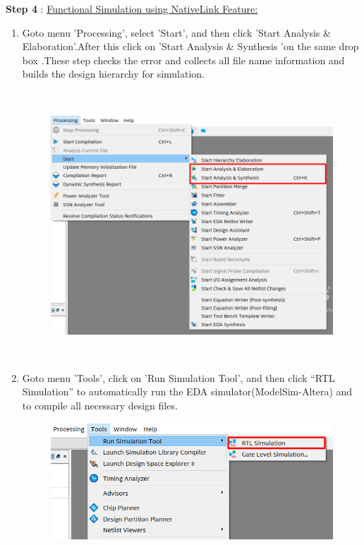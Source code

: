 \documentclass[12pt,singleside,a4paper]{article}
\begin{document}
\noindent \textbf{Step 4} : \underline{ Functional Simulation using NativeLink Feature:}
\begin{enumerate}
    \item Goto menu 'Processing', select 'Start', and then click 'Start Analysis \& Elaboration'.After this click on 'Start Analysis \& Synthesis 'on the same drop box .These step checks the error and collects all file name information and builds the design hierarchy for simulation.
        \begin{figure}[H]
            \centering
            \includegraphics[height=10cm, width=15cm]{nativelink/new analyse.png}
        \end{figure}
    \newpage
    \item Goto menu 'Tools', click on 'Run Simulation Tool', and then click
         “RTL Simulation” to automatically run the EDA simulator(ModelSim-Altera) and to compile all necessary design files.
         \begin{figure}[H]
            \centering
            \includegraphics[scale=0.45]{nativelink/native link run.png}
        \end{figure}


\end{enumerate}
\end{document}
